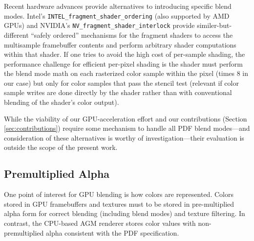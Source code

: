 Recent hardware advances provide alternatives to introducing specific
blend modes.  Intel's {\tt INTEL\_fragment\_shader\_ordering}
\cite{INTELfsoSpec} (also supported by AMD GPUs) and NVIDIA's
{\tt NV\_fragment\_shader\_interlock} \cite{NVfsiSpec} provide
similer-but-different ``safely ordered'' mechanisms for the fragment
shaders to access the multisample framebuffer contents and perform arbitrary shader
computations within that shader.  If one tries to avoid the high cost of per-sample shading, 
the performance challenge for efficient per-pixel shading is the shader must perform
the blend mode math on each rasterized color sample within the pixel (times 8 in our case) but only
for color samples that pass the stencil test (relevant if color sample writes are done directly
by the shader rather than with conventional blending of the shader's color output).

While the viability of our GPU-acceleration effort and our contributions
(Section \ref{sec:contributions}) require some mechanism to handle all
PDF blend modes---and consideration of these alternatives is worthy of
investigation---their evaluation is outside the scope of the present
work.
\fi

\subsection{Premultiplied Alpha}
\label{sec:premultiplied}

One point of interest for GPU blending is how colors are represented.  Colors stored in GPU framebuffers and
textures must to be stored in pre-multiplied alpha form \cite{PreMultAlpha} for correct blending (including blend modes)
and texture filtering.  In contrast, the CPU-based AGM renderer stores color values with non-premultiplied alpha
consistent with the PDF specification.
